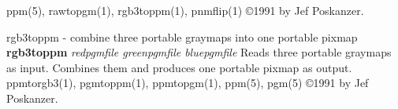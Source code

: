ppm(5), rawtopgm(1), rgb3toppm(1), pnmflip(1)
\copyright 1991 by Jef Poskanzer.
%
 
%

\newpage
%

rgb3toppm - combine three portable graymaps into one portable pixmap
{\bf rgb3toppm}
{\it redpgmfile greenpgmfile bluepgmfile}
Reads three portable graymaps as input.
Combines them and produces one portable pixmap as output.
ppmtorgb3(1), pgmtoppm(1), ppmtopgm(1), ppm(5), pgm(5)
\copyright 1991 by Jef Poskanzer.
%
 
%

\newpage
%

